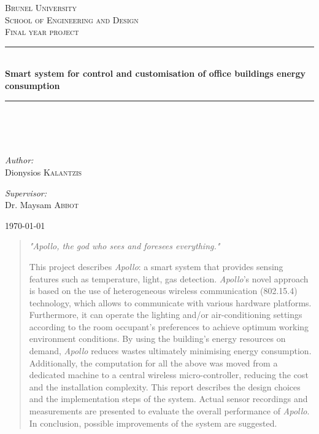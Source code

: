 \documentclass[12pt,a4paper]{report}
\author{Student: Dionisios Kalantzis (SID:0733139) \\ Supervisor: Dr. Maysam Abbod}
\begin{document}
\onehalfspacing
\begin{titlepage}
\begin{center}
%
\textsc{\LARGE Brunel University}\\[1.5cm]
\textsc{\LARGE School of Engineering and Design}\\[1cm]
%
\textsc{\Large Final year project}\\[1cm]
\hrule
\hfill\\[0.5cm]
{ \huge \bfseries Smart system for control and customisation of office buildings energy consumption}\\[0.5cm]
\hrule
\hfill\\[0.5cm]
\ \\
\hfill\\[0.2cm]
\begin{minipage}{0.4\textwidth}
\begin{flushleft} \large
\emph{Author:}\\
Dionysios \textsc{Kalantzis}
\end{flushleft}
\end{minipage}
\begin{minipage}{0.4\textwidth}
\begin{flushright} \large
\emph{Supervisor:} \\
Dr. Maysam \textsc{Abbot}
\end{flushright}
\end{minipage}
\vfill
{\large \today}
\end{center}
\end{titlepage}
\newpage
%
\newpage
\begin{abstract}
\begin{center}
\emph{"Apollo, the god who sees and foresees everything."}
\end{center}
%
This project describes \emph{Apollo}: a smart system that provides sensing features such as temperature, light, gas detection.
\emph{Apollo}'s novel approach is based on the use of heterogeneous wireless communication (802.15.4) technology, which allows to communicate with various hardware platforms. 
Furthermore, it can operate the lighting and/or air-conditioning settings according to the room occupant's preferences to achieve optimum working environment conditions.
By using the building's energy resources on demand, \emph{Apollo} reduces wastes ultimately minimising energy consumption. 
Additionally, the computation for all the above was moved from a dedicated machine to a central wireless micro-controller, reducing the cost and the installation complexity. 
This report describes the design choices and the implementation steps of the system.
Actual sensor recordings and measurements are presented to evaluate the overall performance of \emph{Apollo}.
In conclusion, possible improvements of the system are suggested.

\end{abstract}
\end{document}
